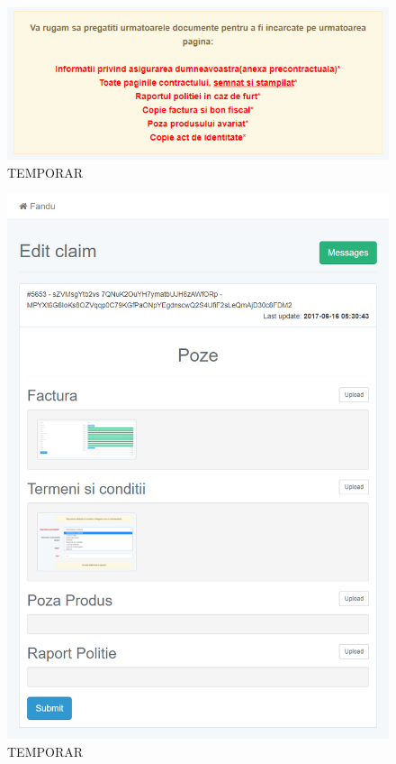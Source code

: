 	\begin{figure}
		\includegraphics[width=\linewidth]{../imagini/register_poze.png}
		\caption{TEMPORAR}
		\label{fig:TEMP}
	\end{figure}
	\begin{figure}
		\includegraphics[width=\linewidth]{../imagini/report_incarcare_poze.png}
		\caption{TEMPORAR}
		\label{fig:TEMP}
	\end{figure}
